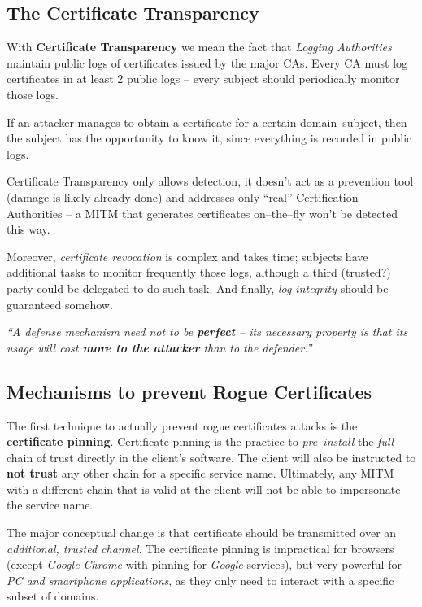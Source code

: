 \documentclass[10pt]{extbook}
\begin{document}
\subsection{The Certificate Transparency}

With \textbf{Certificate Transparency} we mean the fact that \emph{Logging
Authorities} maintain public logs of certificates issued by the major CAs.
Every CA must log certificates in at least 2 public logs -- every subject
should periodically monitor those logs.

If an attacker manages to obtain a certificate for a certain domain\---subject,
then the subject has the opportunity to know it, since everything is recorded
in public logs.

Certificate Transparency only allows detection, it doesn't act as a prevention
tool (damage is likely already done) and addresses only ``real'' Certification
Authorities -- a MITM that generates certificates on--the--fly won't be
detected this way.

Moreover, \emph{certificate revocation} is complex and takes time; subjects
have additional tasks to monitor frequently those logs, although a third
(trusted?) party could be delegated to do such task. And finally, \emph{log
integrity} should be guaranteed somehow.

\bigskip
\begin{center}
    \emph{``A defense mechanism need not to be \textbf{perfect} -- its necessary
    property is that its usage will cost \textbf{more to the attacker} than to
the defender.''}
\end{center}
\bigskip

\subsection{Mechanisms to prevent Rogue Certificates}

The first technique to actually prevent rogue certificates attacks is the
\textbf{certificate pinning}. Certificate pinning is the practice to
\emph{pre--install} the \emph{full} chain of trust directly in the client's
software. The client will also be instructed to \textbf{not trust} any other
chain for a specific service name. Ultimately, any MITM with a different chain
that is valid at the client will not be able to impersonate the service name.

The major conceptual change is that certificate should be transmitted over an
\emph{additional, trusted channel}. The certificate pinning is impractical for
browsers (except \emph{Google Chrome} with pinning for \emph{Google} services),
but very powerful for \emph{PC and smartphone applications}, as they only need
to interact with a specific subset of domains.
\end{document}
